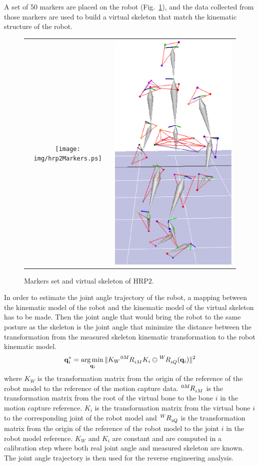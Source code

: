 \documentclass[letterpaper, 10pt, conference]{ieeeconf}      %
\begin{document}
A set of 50 markers
are placed on the robot (Fig.~\ref{fig:hrp2Markers}), and the data collected from those markers
are used to build a virtual skeleton that match the kinematic structure of the robot.
\begin{figure}[t]
  \centering
  \begin{tabular}{cc}
    \texttt{[image: img/hrp2Markers.ps]} &
    \includegraphics[height=0.7\linewidth]{img/skel.ps} \\
  \end{tabular}
  \caption{Markers set and virtual skeleton of HRP2.}
  \label{fig:hrp2Markers}
\end{figure}

In order to estimate the joint angle trajectory of the robot, a mapping between
the kinematic model of the robot and the kinematic model of the virtual skeleton
has to be made. Then the joint angle that would bring the robot to the same posture
as the skeleton is the joint angle that minimize the distance between
the transformation from the measured skeleton kinematic transformation to the robot kinematic model.
\begin{equation}
  \mbf{q}^*_i = \underset{\mbf{q}_i}\argmin \Vert K_W\tensor[^{0M}]{R}{_{iM}}K_i \ominus \tensor[^W]{R}{_{iQ}}(\mbf{q}_i) \Vert ^2\\
  \label{mocapOpti}
\end{equation}
where $K_W$ is the transformation matrix from the origin of the reference of the robot model to the reference of the 
motion capture data. $\tensor[^{0M}]{R}{_{iM}}$ is the transformation matrix from the root of the virtual bone to
the bone $i$ in the motion capture reference. $K_i$ is the transformation matrix from the virtual bone $i$ to
the corresponding joint of the robot model and $\tensor[^W]{R}{_{iQ}}$ is the transformation matrix from 
the origin of the reference of the robot model to the joint $i$ in the robot model reference.
$K_W$ and $K_i$ are constant and are computed in a calibration step where both real joint angle and
measured skeleton are known. The joint angle trajectory is then used for the reverse engineering analysis.\\
\end{document}
